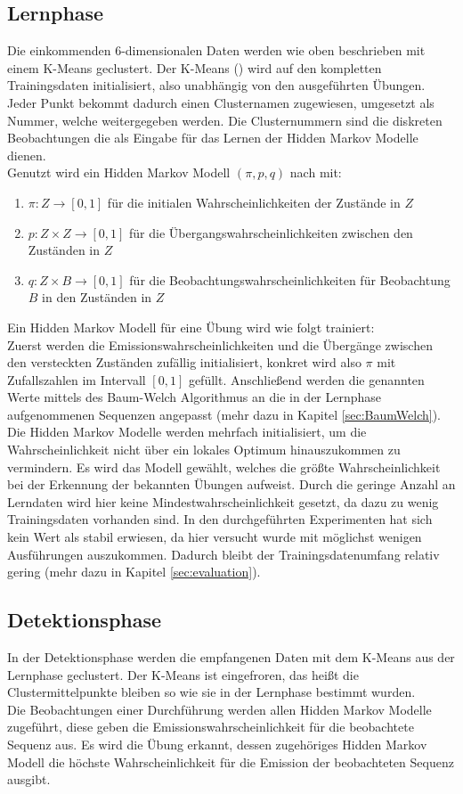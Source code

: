 \documentclass{article}
\begin{document}
\subsection{Lernphase}
Die einkommenden 6-dimensionalen Daten werden wie oben beschrieben mit einem K-Means geclustert.
Der K-Means (\cite{SklearnClusterKMeans2021}) wird auf den kompletten Trainingsdaten initialisiert, also unabhängig von den ausgeführten Übungen.
Jeder Punkt bekommt dadurch einen Clusternamen zugewiesen, umgesetzt als Nummer, welche weitergegeben werden.
Die Clusternummern sind die diskreten Beobachtungen die als Eingabe für das Lernen der Hidden Markov Modelle dienen.\\
Genutzt wird ein Hidden Markov Modell $(\pi, p, q)$ nach \cite{rabinerTutorialHiddenMarkov2001} mit:
\begin{enumerate}
\item $\pi: Z \rightarrow [0,1]$ für die initialen Wahrscheinlichkeiten der Zustände in $Z$
\item $p: Z \times Z \rightarrow [0,1]$ für die Übergangswahrscheinlichkeiten zwischen den Zuständen in $Z$
\item $q: Z \times B \rightarrow [0,1]$ für die Beobachtungswahrscheinlichkeiten für Beobachtung $B$ in den Zuständen in $Z$
\end{enumerate}
Ein Hidden Markov Modell für eine Übung wird wie folgt trainiert:\\
Zuerst werden die Emissionswahrscheinlichkeiten und die Übergänge zwischen den versteckten Zuständen zufällig initialisiert, konkret wird also $\pi$ mit Zufallszahlen im Intervall $[0,1]$ gefüllt.
Anschließend werden die genannten Werte mittels des Baum-Welch Algorithmus an die in der Lernphase aufgenommenen Sequenzen angepasst (mehr dazu in Kapitel \ref{sec:BaumWelch}).
Die Hidden Markov Modelle werden mehrfach initialisiert, um die Wahrscheinlichkeit nicht über ein lokales Optimum hinauszukommen zu vermindern.
Es wird das Modell gewählt, welches die größte Wahrscheinlichkeit bei der Erkennung der bekannten Übungen aufweist.
Durch die geringe Anzahl an Lerndaten wird hier keine Mindestwahrscheinlichkeit gesetzt, da dazu zu wenig Trainingsdaten vorhanden sind.
In den durchgeführten Experimenten hat sich kein Wert als stabil erwiesen, da hier versucht wurde mit möglichst wenigen Ausführungen auszukommen.
Dadurch bleibt der Trainingsdatenumfang relativ gering (mehr dazu in Kapitel \ref{sec:evaluation}).

\subsection{Detektionsphase}
In der Detektionsphase werden die empfangenen Daten mit dem K-Means aus der Lernphase geclustert.
Der K-Means ist eingefroren, das heißt die Clustermittelpunkte bleiben so wie sie in der Lernphase bestimmt wurden.\\
Die Beobachtungen einer Durchführung werden allen Hidden Markov Modelle zugeführt, diese geben die Emissionswahrscheinlichkeit für die beobachtete Sequenz aus.
Es wird die Übung erkannt, dessen zugehöriges Hidden Markov Modell die höchste Wahrscheinlichkeit für die Emission der beobachteten Sequenz ausgibt.
\end{document}
